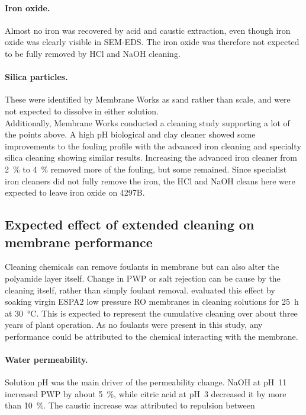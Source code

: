 \paragraph{Iron oxide.}  Almost no iron was recovered by acid and caustic extraction, even though iron oxide was clearly visible in SEM-EDS. The iron oxide was therefore not expected to be fully removed by HCl and NaOH cleaning.
\paragraph{Silica particles.} These were identified by Membrane Works as sand rather than scale, and were not expected to dissolve in either solution.\\

Additionally, Membrane Works conducted a cleaning study supporting a lot of the points above. A high pH biological and clay cleaner showed some improvements to the fouling profile with the advanced iron cleaning and specialty silica cleaning showing similar results. Increasing the advanced iron cleaner from \qty{2}{\percent} to \qty{4}{\percent} removed more of the fouling, but some remained. Since specialist iron cleaners did not fully remove the iron, the HCl and NaOH cleans here were expected to leave iron oxide on 4297B.

\subsection{Expected effect of extended cleaning on membrane performance}
Cleaning chemicals can remove foulants in membrane but can also alter the polyamide layer itself. Change in PWP or salt rejection can be cause by the cleaning itself, rather than simply foulant removal. \cite{tu2015chemical} evaluated this effect by soaking virgin ESPA2 low pressure RO membranes in cleaning solutions for \qty{25}{\hour} at \qty{30}{\celsius}. This is expected to represent the cumulative cleaning over about three years of plant operation. As no foulants were present in this study, any performance could be attributed to the chemical interacting with the membrane.

\paragraph{Water permeability.} Solution pH was the main driver of the permeability change. NaOH at pH~11 increased PWP by about \qty{5}{\percent}, while citric acid at pH~3 decreased it by more than \qty{10}{\percent}\citep{tu2015chemical}. The caustic increase was attributed to repulsion between  

